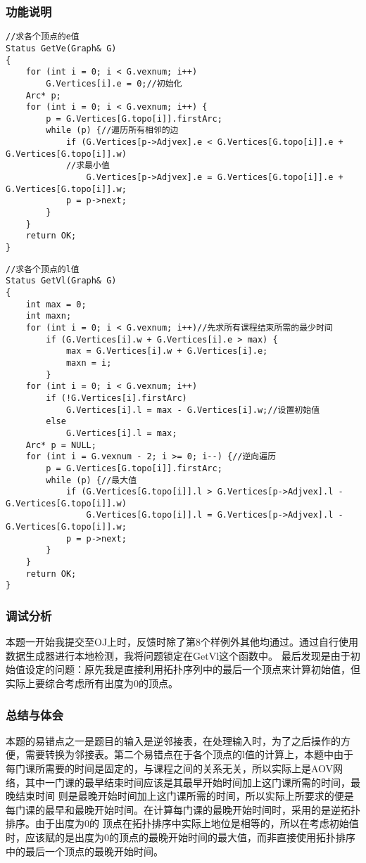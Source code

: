 \documentclass[a4paper,11pt]{article}%
\begin{document}
\subsubsection{功能说明}
\begin{lstlisting}[language={[ANSI]C},keywordstyle=\color{blue!70},commentstyle=\color{red!50!green!50!blue!50},frame=shadowbox,
				rulesepcolor=\color{red!20!green!20!blue!20}]
//求各个顶点的e值
Status GetVe(Graph& G)
{
	for (int i = 0; i < G.vexnum; i++)
		G.Vertices[i].e = 0;//初始化
	Arc* p;
	for (int i = 0; i < G.vexnum; i++) {
		p = G.Vertices[G.topo[i]].firstArc;
		while (p) {//遍历所有相邻的边
			if (G.Vertices[p->Adjvex].e < G.Vertices[G.topo[i]].e + G.Vertices[G.topo[i]].w)
            //求最小值
				G.Vertices[p->Adjvex].e = G.Vertices[G.topo[i]].e + G.Vertices[G.topo[i]].w;
			p = p->next;
		}
	}
	return OK;
}
\end{lstlisting}
\begin{lstlisting}[language={[ANSI]C},keywordstyle=\color{blue!70},commentstyle=\color{red!50!green!50!blue!50},frame=shadowbox,
				rulesepcolor=\color{red!20!green!20!blue!20}]
//求各个顶点的l值
Status GetVl(Graph& G)
{
    int max = 0;
    int maxn;
    for (int i = 0; i < G.vexnum; i++)//先求所有课程结束所需的最少时间
        if (G.Vertices[i].w + G.Vertices[i].e > max) {
            max = G.Vertices[i].w + G.Vertices[i].e;
            maxn = i;
        }
    for (int i = 0; i < G.vexnum; i++)
        if (!G.Vertices[i].firstArc)
            G.Vertices[i].l = max - G.Vertices[i].w;//设置初始值
        else
            G.Vertices[i].l = max;
    Arc* p = NULL;
    for (int i = G.vexnum - 2; i >= 0; i--) {//逆向遍历
        p = G.Vertices[G.topo[i]].firstArc;
        while (p) {//最大值
            if (G.Vertices[G.topo[i]].l > G.Vertices[p->Adjvex].l - G.Vertices[G.topo[i]].w)
                G.Vertices[G.topo[i]].l = G.Vertices[p->Adjvex].l - G.Vertices[G.topo[i]].w;
            p = p->next;
        }
    }
    return OK;
}
\end{lstlisting}
\subsubsection{调试分析}
本题一开始我提交至OJ上时，反馈时除了第8个样例外其他均通过。通过自行使用数据生成器进行本地检测，我将问题锁定在GetVl这个函数中。
最后发现是由于初始值设定的问题：原先我是直接利用拓扑序列中的最后一个顶点来计算初始值，但实际上要综合考虑所有出度为0的顶点。
\subsubsection{总结与体会}
本题的易错点之一是题目的输入是逆邻接表，在处理输入时，为了之后操作的方便，需要转换为邻接表。第二个易错点在于各个顶点的l值的计算上，本题中由于
每门课所需要的时间是固定的，与课程之间的关系无关，所以实际上是AOV网络，其中一门课的最早结束时间应该是其最早开始时间加上这门课所需的时间，最晚结束时间
则是最晚开始时间加上这门课所需的时间，所以实际上所要求的便是每门课的最早和最晚开始时间。在计算每门课的最晚开始时间时，采用的是逆拓扑排序。由于出度为0的
顶点在拓扑排序中实际上地位是相等的，所以在考虑初始值时，应该赋的是出度为0的顶点的最晚开始时间的最大值，而非直接使用拓扑排序中的最后一个顶点的最晚开始时间。
\end{document}
